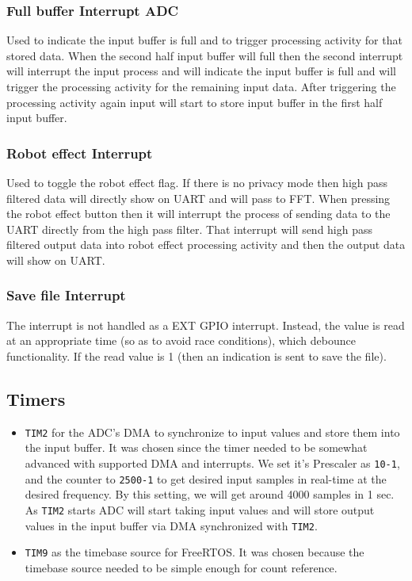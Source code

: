 \documentclass[11pt]{article}
\begin{document}
\subsubsection*{Full buffer Interrupt ADC}
\label{sec:orgac6ad03}
Used to indicate the input buffer is full and to trigger processing activity for that stored data. When the second half input buffer will full then the second interrupt will interrupt the input process and will indicate the input buffer is full and will trigger the processing activity for the remaining input data.  After triggering the processing activity again input will start to store input buffer in the first half input buffer.
\subsubsection*{Robot effect Interrupt}
\label{sec:org4fb7d97}
Used to toggle the robot effect flag. If there is no privacy mode then high pass filtered data will directly show on UART and will pass to FFT. When pressing the robot effect button then it will interrupt the process of sending data to the UART directly from the high pass filter. That interrupt will send high pass filtered output data into robot effect processing activity and then the output data will show on UART.
\subsubsection*{Save file Interrupt}
\label{sec:org4e9f920}
The interrupt is not handled as a EXT GPIO interrupt. Instead, the value is read at an appropriate time (so as to avoid race conditions), which debounce functionality. If the read value is 1 (then an indication is sent to save the file).

\subsection{Timers}
\label{sec:orgac08358}

\begin{itemize}
\item \texttt{TIM2} for the ADC's DMA to synchronize to input values and store them into the input buffer. It was chosen since the timer needed to be somewhat advanced with supported DMA and interrupts. We set it's Prescaler as \texttt{10-1}, and the counter to \texttt{2500-1} to get desired input samples in real-time at the desired frequency. By this setting, we will get around 4000 samples in 1 sec. As \texttt{TIM2} starts ADC will start taking input values and will store output values in the input buffer via DMA synchronized with \texttt{TIM2}.
\item \texttt{TIM9} as the timebase source for FreeRTOS. It was chosen because the timebase source needed to be simple enough for count reference.
\end{itemize}
\end{document}
